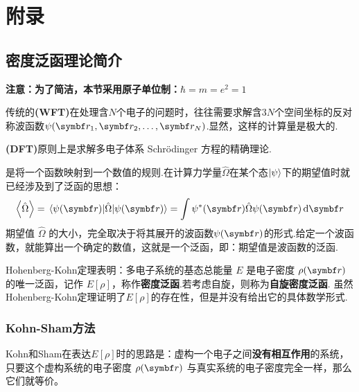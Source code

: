 \chapter{附录}
\section{密度泛函理论简介}
\begin{center}
    \textbf{注意：为了简洁，本节采用原子单位制：$\hbar = m = e^2 = 1$}
\end{center}

传统的\textbf{(WFT)}在处理含$N$个电子的问题时，往往需要求解含$3N$个空间坐标的反对称波函数$\psi(\vect{r}_1, \vect{r}_2, \dots, \vect{r}_N)$.显然，这样的计算量是极大的.

\textbf{(DFT)}原则上是求解多电子体系 Schrödinger 方程的精确理论.

是将一个函数映射到一个数值的规则.在计算力学量$\hat{\Omega}$在某个态$\ket{\psi}$下的期望值时就已经涉及到了泛函的思想：
\[\ev{\hat{\Omega}} = \ev{\hat{\Omega}}{\psi(\vect{r})} = \int \psi^*(\vect{r}) \hat{\Omega} \psi(\vect{r}) \dd{\vect{r}}\]
期望值 $\hat{\Omega}$ 的大小，完全取决于将其展开的波函数$\psi(\vect{r})$的形式.给定一个波函数，就能算出一个确定的数值，这就是一个泛函，即：期望值是波函数的泛函.

Hohenberg-Kohn定理表明：多电子系统的基态总能量 $E$ 是电子密度 $\rho(\vect{r})$ 的唯一泛函，记作 $E[\rho]$，称作\textbf{密度泛函}.若考虑自旋，则称为\textbf{自旋密度泛函}.
虽然Hohenberg-Kohn定理证明了$E[\rho]$的存在性，但是并没有给出它的具体数学形式.

\subsection{Kohn-Sham方法}
Kohn和Sham在表达$E[\rho]$时的思路是：虚构一个电子之间\textbf{没有相互作用}的系统，只要这个虚构系统的电子密度 $\rho(\vect{r})$ 与真实系统的电子密度完全一样，那么它们就等价。

